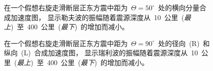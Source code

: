 \begin{figure}[!t]
\begin{center}
\end{center}
\caption[seismogram5]{
\label{fig:10.16}
在一个假想右旋走滑断层正东方震中距为~$\Theta=50^\circ$~处的横向分量合成加速度图，
显示勒夫波的振幅随着震源深度从~10~公里~({\em 最上\/})~至~400~公里~({\em 最下\/})~的增加而减小。}
\end{figure}
\begin{figure}[!b]
\begin{center}
\end{center}
\caption[seismogram6]{
\label{fig:10.17}
在一个假想右旋走滑断层正东方震中距为~$\Theta=90^\circ$~处的径向~(R)~和纵向~(L)~合成加速度图，
显示瑞利波的振幅随着震源深度从~10~公里~({\em 最上\/})~至~400~公里~({\em 最下\/})~的增加而减小。}
\end{figure}

